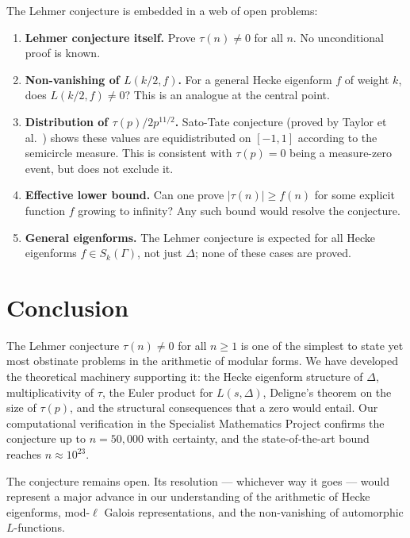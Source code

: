 \documentclass[12pt,a4paper]{amsart}
\theoremstyle{definition}
\begin{document}
The Lehmer conjecture is embedded in a web of open problems:

\begin{enumerate}[leftmargin=2em, label=\textbullet]
  \item \textbf{Lehmer conjecture itself.} Prove $\tau(n) \neq 0$ for all $n$.
        No unconditional proof is known.
  \item \textbf{Non-vanishing of $L(k/2, f)$.} For a general Hecke eigenform
        $f$ of weight $k$, does $L(k/2, f) \neq 0$? This is an analogue at the
        central point.
  \item \textbf{Distribution of $\tau(p)/2p^{11/2}$.} Sato-Tate conjecture
        (proved by Taylor et al.\ \cite{Taylor2008}) shows these values are
        equidistributed on $[-1, 1]$ according to the semicircle measure. This
        is consistent with $\tau(p) = 0$ being a measure-zero event, but does
        not exclude it.
  \item \textbf{Effective lower bound.} Can one prove $|\tau(n)| \geq f(n)$ for
        some explicit function $f$ growing to infinity? Any such bound would
        resolve the conjecture.
  \item \textbf{General eigenforms.} The Lehmer conjecture is expected for all
        Hecke eigenforms $f \in S_k(\Gamma)$, not just $\Delta$; none of these
        cases are proved.
\end{enumerate}

\section{Conclusion}

The Lehmer conjecture $\tau(n) \neq 0$ for all $n \geq 1$ is one of the simplest
to state yet most obstinate problems in the arithmetic of modular forms. We have
developed the theoretical machinery supporting it: the Hecke eigenform structure of
$\Delta$, multiplicativity of $\tau$, the Euler product for $L(s, \Delta)$,
Deligne's theorem on the size of $\tau(p)$, and the structural consequences that a
zero would entail. Our computational verification in the Specialist Mathematics
Project confirms the conjecture up to $n = 50{,}000$ with certainty, and the
state-of-the-art bound reaches $n \approx 10^{23}$.

The conjecture remains open. Its resolution --- whichever way it goes --- would
represent a major advance in our understanding of the arithmetic of Hecke
eigenforms, mod-$\ell$ Galois representations, and the non-vanishing of
automorphic $L$-functions.
\end{document}
